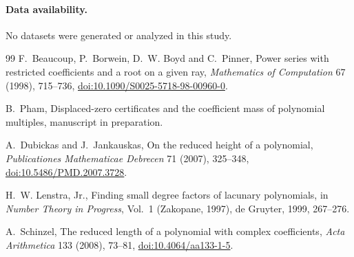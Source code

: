 \documentclass[11pt]{article}
\begin{document}
\paragraph{Data availability.}
No datasets were generated or analyzed in this study.

\begin{thebibliography}{99}
\small
{}
F.~Beaucoup, P.~Borwein, D.~W. Boyd and C.~Pinner,
\newblock Power series with restricted coefficients and a root on a given ray,
\newblock \emph{Mathematics of Computation} 67 (1998), 715--736,
\newblock \href{https://doi.org/10.1090/S0025-5718-98-00960-0}
{doi:10.1090/S0025-5718-98-00960-0}.

B.~Pham,
\newblock Displaced-zero certificates and the coefficient mass of polynomial
multiples,
\newblock manuscript in preparation.

A.~Dubickas and J.~Jankauskas,
\newblock On the reduced height of a polynomial,
\newblock \emph{Publicationes Mathematicae Debrecen} 71 (2007), 325--348,
\newblock \href{https://doi.org/10.5486/PMD.2007.3728}
{doi:10.5486/PMD.2007.3728}.

H.~W. Lenstra, Jr.,
\newblock Finding small degree factors of lacunary polynomials,
\newblock in \emph{Number Theory in Progress}, Vol.~1 (Zakopane, 1997),
de Gruyter, 1999, 267--276.

A.~Schinzel,
\newblock The reduced length of a polynomial with complex coefficients,
\newblock \emph{Acta Arithmetica} 133 (2008), 73--81,
\newblock \href{https://doi.org/10.4064/aa133-1-5}
{doi:10.4064/aa133-1-5}.
\end{thebibliography}
\end{document}
